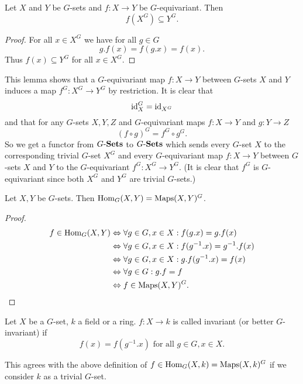 \begin{lem}
 Let $X$ and $Y$ be $G$-sets and $f : X \to Y$ be $G$-equivariant. Then
 \[
  f(X^G) \subseteq Y^G.
 \]
\end{lem}
\begin{proof}
 For all $x \in X^G$ we have for all $g \in G$
 \[
  g.f(x) = f(g.x) = f(x).
 \]
 Thus $f(x) \subseteq Y^G$ for all $x \in X^G$.
\end{proof}


This lemma shows that a $G$-equivariant map $f : X \to Y$ between $G$-sets $X$ and $Y$ induces a map $f^G : X^G \to Y^G$ by restriction. It is clear that
\[
 \operatorname{id}_X^G = \operatorname{id}_{X^G}
\]
and that for any $G$-sets $X,Y,Z$ and $G$-equivariant maps $f : X \to Y$ and $g : Y \to Z$
\[
 (f \circ g)^G =  f^G \circ g^G.
\]
So we get a functor from $G\text{-}\mathbf{Sets}$ to $G\text{-}\mathbf{Sets}$ which sends every $G$-set $X$ to the corresponding trivial $G$-set $X^G$ and every $G$-equivariant map $f : X \to Y$ between $G$-sets $X$ and $Y$ to the $G$-equivariant $f^G : X^G \to Y^G$. (It is clear that $f^G$ is $G$-equivariant since both $X^G$ and $Y^G$ are trivial $G$-sets.)


\begin{lem}
 Let $X, Y$ be $G$-sets. Then $\operatorname{Hom}_G(X,Y) = \operatorname{Maps}(X,Y)^G$.
\end{lem}
\begin{proof}
 \begin{align*}
  f \in \operatorname{Hom}_G(X,Y)
  &\Leftrightarrow \forall g \in G, x \in X : f(g.x) = g.f(x) \\
  &\Leftrightarrow \forall g \in G, x \in X : f(g^{-1}.x) = g^{-1}.f(x) \\
  &\Leftrightarrow \forall g \in G, x \in X : g.f(g^{-1}.x) = f(x) \\
  &\Leftrightarrow \forall g \in G : g.f = f \\
  &\Leftrightarrow f \in \operatorname{Maps}(X,Y)^G.
 \end{align*}
\end{proof}


\begin{defi}
 Let $X$ be a $G$-set, $k$ a field or a ring. $f : X \to k$ is called invariant (or better $G$-invariant) if
 \[
  f(x) = f(g^{-1}.x) \text{ for all } g \in G, x \in X.
 \]
\end{defi}


\begin{note}
 This agrees with the above definition of $f \in \operatorname{Hom}_G(X,k) = \operatorname{Maps}(X,k)^G$ if we consider $k$ as a trivial $G$-set.
\end{note}



